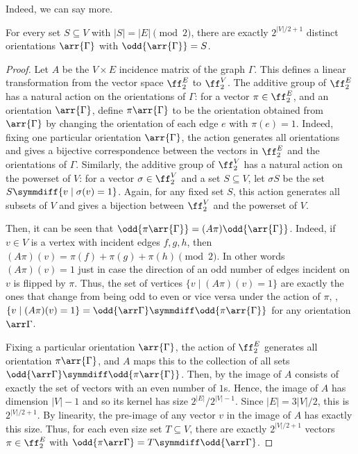 \documentclass{toc}
\begin{document}
Indeed, we can say more.

\begin{lemma}\label{lem:linear}
  For every set $S \subseteq V$ with $|S| = |E| \pmod 2$, there are exactly
  $2^{|V|/2 + 1}$ distinct orientations $\arr{\Gamma}$ with $\odd{\arr{\Gamma}} = S$.
\end{lemma}
\begin{proof}
  Let $A$ be the $V \times E$ incidence matrix of the graph $\Gamma$. This defines a
  linear transformation from the vector space $\ff_{2}^{E}$ to $\ff_{2}^{V}$.
  The additive group of $\ff_{2}^{E}$ has a natural action on the orientations
  of $\Gamma$: for a vector $\pi \in \ff_{2}^{E}$, and an orientation $\arr{\Gamma}$,
  define $\pi\arr{\Gamma}$ to be the orientation obtained from $\arr{\Gamma}$ by changing
  the orientation of each edge $e$ with $\pi(e) = 1$. Indeed, fixing one
  particular orientation $\arr{\Gamma}$, the action generates all orientations and
  gives a bijective correspondence between the vectors in $\ff_{2}^{E}$ and the
  orientations of $\Gamma$. Similarly, the additive group of $\ff_{2}^{V}$ has a
  natural action on the powerset of $V$: for a vector $\sigma \in \ff_{2}^{V}$
  and a set $S \subseteq V$, let $\sigma S$ be the set $S \symmdiff \{v \mid
  \sigma(v) = 1\}$. Again, for any fixed set $S$, this action generates all
  subsets of $V$ and gives a bijection between $\ff_{2}^{V}$ and the powerset
  of $V$.

  Then, it can be seen that $\odd{\pi \arr{\Gamma}} = (A \pi) \odd{\arr{\Gamma}}$. Indeed,
  if $v \in V$ is a vertex with incident edges $f,g,h$, then $(A\pi)(v) =
  \pi(f)+\pi(g)+\pi(h) \pmod 2$. In other words $(A\pi)(v) = 1$ just in case the
  direction of an odd number of edges incident on $v$ is flipped by $\pi$. Thus,
  the set of vertices $\{v \mid (A\pi)(v) = 1\}$ are exactly the ones that
  change from being odd to even or vice versa under the action of $\pi$, \ie,
  $\{v \mid (A\pi)(v) = 1\} = \odd{\arr \Gamma} \symmdiff \odd{\pi \arr{\Gamma}}$ for any
  orientation $\arr \Gamma$.

  Fixing a particular orientation $\arr{\Gamma}$, the action of $\ff_{2}^{E}$
  generates all orientation $\pi\arr{\Gamma}$, and $A$ maps this to the collection of
  all sets $\odd{\arr \Gamma} \symmdiff \odd{\pi \arr{\Gamma}}$. Then, by
    the image
  of $A$ consists of exactly the set of vectors with an even number of $1$s.
  Hence, the image of $A$ has dimension $|V|-1$ and so its kernel has size
  $2^{|E|}/2^{|V|-1}$. Since $|E| = 3|V|/2$, this is $2^{|V|/2+1}$. By
  linearity, the pre-image of any vector $v$ in the image of $A$ has exactly
  this size. Thus, for each even size set $T \subseteq V$, there are exactly
  $2^{|V|/2+1}$ vectors $\pi \in \ff_{2}^{E}$ with $\odd{\pi \arr \Gamma} = T
  \symmdiff \odd{\arr \Gamma}$.
\end{proof}
\end{document}
